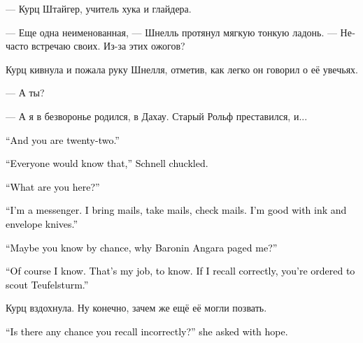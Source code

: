 \documentclass[a4paper,12pt,fleqn]{book}\usepackage{cooltooltips}\usepackage{polyglossia}\setdefaultlanguage[babelshorthands=true]{russian}\setotherlanguage{english}\defaultfontfeatures{Ligatures=TeX,Mapping=tex-text} \usepackage{xcolor}\definecolor{lightgray}{HTML}{bbbbbb}\color{lightgray}\newcommand{\ml}[3]{\textenglish{\textcolor{black}{#3}}}
\begin{document}
--- Курц Штайгер, учитель хука и глайдера.

--- Еще одна неименованная, --- Шнелль протянул мягкую тонкую ладонь.
--- Нечасто встречаю своих.
Из-за этих ожогов?

Курц кивнула и пожала руку Шнелля, отметив, как легко он говорил о её увечьях.

--- А ты?

--- А я в безворонье родился, в Дахау.
Старый Рольф преставился, и...

\ml{$0$}
{--- И тебе двадцать два года.}
{``And you are twenty-two.''}

\ml{$0$}
{--- Все всегда угадывают мой возраст, --- хихикнул Шнелль.}
{``Everyone would know that,'' Schnell chuckled.}

\ml{$0$}
{--- Кем ты здесь работаешь?}
{``What are you here?''}

\ml{$0$}
{--- Я гонец.}
{``I'm a messenger.}
\ml{$0$}
{Почту приношу, уношу, проверяю.}
{I bring mails, take mails, check mails.}
\ml{$0$}
{Хорошо обращаюсь с чернилами и ножом для конвертов.}
{I'm good with ink and envelope knives.''}

\ml{$0$}
{--- Может быть, ты случайно знаешь, зачем баронин Ангара меня вызвала?}
{``Maybe you know by chance, why Baronin Angara paged me?''}

\ml{$0$}
{--- Знаю, конечно.}
{``Of course I know.}
\ml{$0$}
{Профессия у меня такая --- знать.}
{That's my job, to know.}
\ml{$0$}
{Если мне не изменяет память, тебя отправляют на разведку к Тойфельстурм.}
{If I recall correctly, you're ordered to scout Teufelsturm.''}

Курц вздохнула.
Ну конечно, зачем же ещё её могли позвать.

\ml{$0$}
{--- А если память тебе изменяет? --- с надеждой спросила она.}
{``Is there any chance you recall incorrectly?'' she asked with hope.}
\end{document}
